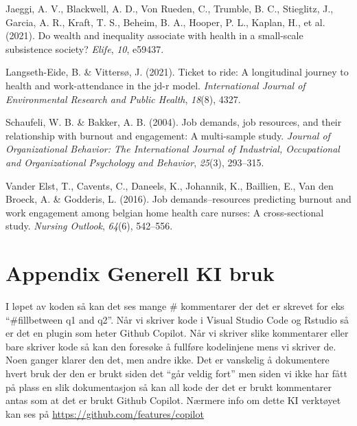 \documentclass[
  12pt,
  a4paper,
  DIV=11,
  numbers=noendperiod]{scrartcl}
\newlength{\cslhangindent}
\newenvironment{CSLReferences}[2] %
 {\begin{list}{}{%
  \setlength{\itemindent}{0pt}
  \setlength{\leftmargin}{0pt}
  \setlength{\parsep}{0pt}
  \ifodd #1
   \setlength{\leftmargin}{\cslhangindent}
   \setlength{\itemindent}{-1\cslhangindent}
  \fi
  \setlength{\itemsep}{#2\baselineskip}}}
 {\end{list}}
\begin{document}
\label{refs}
\begin{CSLReferences}{1}{0}
Jaeggi, A. V., Blackwell, A. D., Von Rueden, C., Trumble, B. C.,
Stieglitz, J., Garcia, A. R., Kraft, T. S., Beheim, B. A., Hooper, P.
L., Kaplan, H., et al. (2021). Do wealth and inequality associate with
health in a small-scale subsistence society? \emph{Elife}, \emph{10},
e59437.

Langseth-Eide, B. \& Vittersø, J. (2021). Ticket to ride: A longitudinal
journey to health and work-attendance in the jd-r model.
\emph{International Journal of Environmental Research and Public
Health}, \emph{18}(8), 4327.

Schaufeli, W. B. \& Bakker, A. B. (2004). Job demands, job resources,
and their relationship with burnout and engagement: A multi-sample
study. \emph{Journal of Organizational Behavior: The International
Journal of Industrial, Occupational and Organizational Psychology and
Behavior}, \emph{25}(3), 293--315.

Vander Elst, T., Cavents, C., Daneels, K., Johannik, K., Baillien, E.,
Van den Broeck, A. \& Godderis, L. (2016). Job demands--resources
predicting burnout and work engagement among belgian home health care
nurses: A cross-sectional study. \emph{Nursing Outlook}, \emph{64}(6),
542--556.

\end{CSLReferences}

\clearpage

\appendix

\section {Appendix Generell KI bruk}

I løpet av koden så kan det ses mange \# kommentarer der det er skrevet
for eks ``\#fillbetween q1 and q2''. Når vi skriver kode i Visual Studio
Code og Rstudio så er det en plugin som heter Github Copilot. Når vi
skriver slike kommentarer eller bare skriver kode så kan den foresøke å
fullføre kodelinjene mens vi skriver de. Noen ganger klarer den det, men
andre ikke. Det er vanskelig å dokumentere hvert bruk der den er brukt
siden det ``går veldig fort'' men siden vi ikke har fått på plass en
slik dokumentasjon så kan all kode der det er brukt kommentarer antas
som at det er brukt Github Copilot. Nærmere info om dette KI verktøyet
kan ses på \url{https://github.com/features/copilot}
\end{document}
